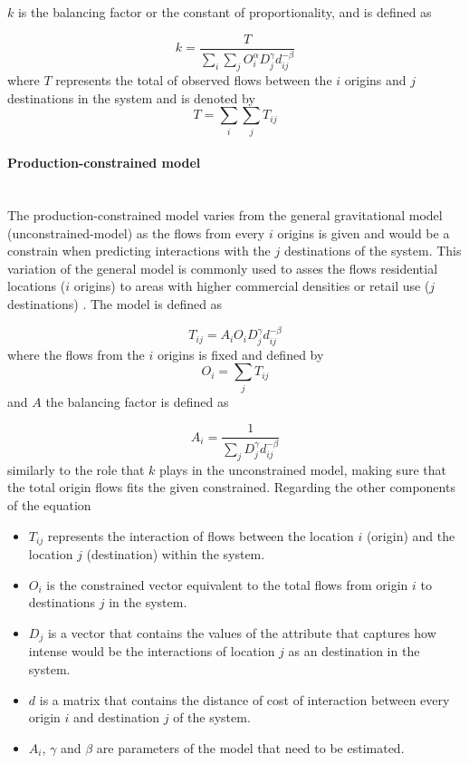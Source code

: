 \documentclass{article}
\begin{document}
$k$ is the balancing factor or the constant of proportionality, and is defined as

\[k = \frac{T}{\sum_i \sum_j O_i^\alpha  D_j^\gamma  d_{ij}^{-\beta}}\] where $T$ represents the total of observed flows between the $i$ origins and $j$ destinations in the system and is denoted by \[T= \sum_i \sum_j T_{ij}\]
\paragraph{Production-constrained model}\mbox{}\\

The production-constrained model varies from the general gravitational model (unconstrained-model) as the flows from every $i$ origins is given and would be a constrain when predicting interactions with the $j$ destinations of the system. This variation of the general model is commonly used to asses the flows residential locations ($i$ origins) to areas with higher commercial densities or retail use ($j$ destinations) \citep{wilkinsonSpatialInteractionModelling2023}. The model is defined as

\[T_{ij} = A_i O_i D_j^\gamma d_{ij}^{-\beta}\] where the flows from the $i$ origins is fixed and defined by \[O_i = \sum_j T_{ij}\] and $A$ the balancing factor is defined as

\[A_i = \frac{1}{\sum_j D_j^\gamma d_{ij}^{-\beta}}\] similarly to the role that $k$ plays in the unconstrained model, making sure that the total origin flows fits the given constrained.  Regarding the other components of the equation

\begin{itemize}
  \item $T_{ij}$ represents the interaction of flows between the location $i$ (origin) and the location $j$ (destination) within the system. 
  \item $O_{i}$ is the constrained vector equivalent to the total flows from origin $i$ to destinations $j$ in the system.
  \item $D_{j}$ is a vector that contains the values of the attribute that captures how intense would be the interactions of location $j$ as an destination in the system.
    \item $d$ is a matrix that contains the distance of cost of interaction between every origin $i$ and destination $j$ of the system.
    \item $A_{i}$, $\gamma$ and $\beta$ are parameters of the model that need to be estimated.
\end{itemize}
\end{document}
